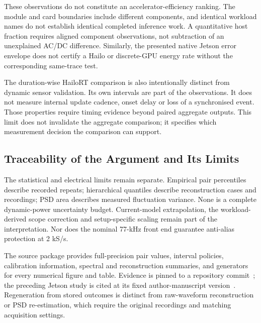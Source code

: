 These observations do not constitute an accelerator-efficiency ranking. The module and card boundaries include different components, and identical workload names do not establish identical completed inference work. A quantitative host fraction requires aligned component observations, not subtraction of an unexplained AC/DC difference. Similarly, the presented native Jetson error envelope does not certify a Hailo or discrete-GPU energy rate without the corresponding same-trace test.

The duration-wise HailoRT comparison is also intentionally distinct from dynamic sensor validation. Its own intervals are part of the observations. It does not measure internal update cadence, onset delay or loss of a synchronised event. Those properties require timing evidence beyond paired aggregate outputs. This limit does not invalidate the aggregate comparison; it specifies which measurement decision the comparison can support.

\subsection{Traceability of the Argument and Its Limits}

The statistical and electrical limits remain separate. Empirical pair percentiles describe recorded repeats; hierarchical quantiles describe reconstruction cases and recordings; PSD area describes measured fluctuation variance. None is a complete dynamic-power uncertainty budget. Current-model extrapolation, the workload-derived scope correction and setup-specific scaling remain part of the interpretation. Nor does the nominal 77-kHz front end guarantee anti-alias protection at 2 kS/s.

The source package provides full-precision pair values, interval policies, calibration information, spectral and reconstruction summaries, and generators for every numerical figure and table. Evidence is pinned to a repository commit~\cite{energyResults2026,pauseEvidence2026}; the preceding Jetson study is cited at its fixed author-manuscript version~\cite{mika2026workshopdraft}. Regeneration from stored outcomes is distinct from raw-waveform reconstruction or PSD re-estimation, which require the original recordings and matching acquisition settings.
